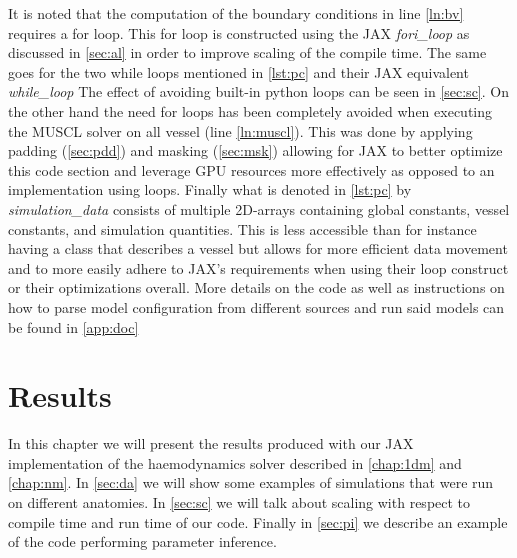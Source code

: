 \documentclass[a4paper, oneside]{discothesis}
\begin{document}
It is noted that the computation of the boundary conditions in line \ref{ln:bv} requires a for loop.
This for loop is constructed using the JAX \emph{fori\_loop} as discussed in \autoref{sec:al} in order to improve scaling of the compile time.
The same goes for the two while loops mentioned in \autoref{lst:pc} and their JAX equivalent \emph{while\_loop}
The effect of avoiding built-in python loops can be seen in \autoref{sec:sc}.
On the other hand the need for loops has been completely avoided when executing the MUSCL solver on all vessel (line \ref{ln:muscl}).
This was done by applying padding (\autoref{sec:pdd}) and masking (\autoref{sec:msk}) allowing for JAX to better optimize this code section and leverage GPU resources more effectively as opposed to an implementation using loops.
Finally what is denoted in \autoref{lst:pc} by \emph{simulation\_data} consists of multiple 2D-arrays containing global constants, vessel constants, and simulation quantities.
This is less accessible than for instance having a class that describes a vessel but allows for more efficient data movement and to more easily adhere to JAX's requirements when using their loop construct or their optimizations overall.
More details on the code as well as instructions on how to parse model configuration from different sources and run said models can be found in \autoref{app:doc}



\chapter{Results} \label{chap:resl}
In this chapter we will present the results produced with our JAX implementation of the haemodynamics solver described in \autoref{chap:1dm} and \autoref{chap:nm}. 
In \autoref{sec:da} we will show some examples of simulations that were run on different anatomies.
In \autoref{sec:sc} we will talk about scaling with respect to compile time and run time of our code.
Finally in \autoref{sec:pi} we describe an example of the code performing parameter inference.
\end{document}
